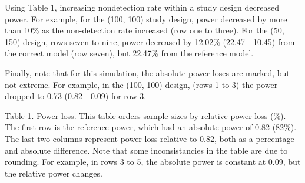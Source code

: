 \documentclass[
]{article}
\begin{document}
Using Table 1, increasing nondetection rate within a study design
decreased power. For example, for the (100, 100) study design, power
decreased by more than 10\% as the non-detection rate increased (row one
to three). For the (50, 150) design, rows seven to nine, power decreased
by 12.02\% (22.47 - 10.45) from the correct model (row seven), but
22.47\% from the reference model.

Finally, note that for this simulation, the absolute power loses are
marked, but not extreme. For example, in the (100, 100) design, (rows 1
to 3) the power dropped to 0.73 (0.82 - 0.09) for row 3.

\pagebreak

Table 1. Power loss. This table orders sample sizes by relative power
loss (\%). The first row is the reference power, which had an absolute
power of 0.82 (82\%). The last two columns represent power loss relative
to 0.82, both as a percentage and absolute difference. Note that some
inconsistancies in the table are due to rounding. For example, in rows 3
to 5, the absolute power is constant at 0.09, but the relative power
changes.
\end{document}
